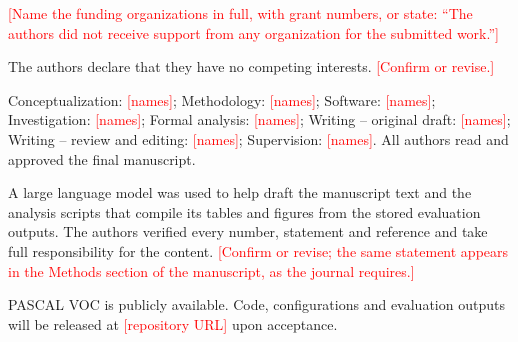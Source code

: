 \documentclass[pdflatex,iicol,sn-basic,Numbered]{sn-jnl}
\newcommand{\ph}[1]{\textcolor{red}{[#1]}}
\begin{document}
\ph{Name the funding organizations in full, with grant numbers, or state: ``The authors did not receive support from any organization for the submitted work.''}

The authors declare that they have no competing interests. \ph{Confirm or revise.}

Conceptualization: \ph{names}; Methodology: \ph{names}; Software: \ph{names}; Investigation: \ph{names}; Formal analysis: \ph{names}; Writing -- original draft: \ph{names}; Writing -- review and editing: \ph{names}; Supervision: \ph{names}. All authors read and approved the final manuscript.

A large language model was used to help draft the manuscript text and the analysis scripts that compile its tables and figures from the stored evaluation outputs. The authors verified every number, statement and reference and take full responsibility for the content. \ph{Confirm or revise; the same statement appears in the Methods section of the manuscript, as the journal requires.}

PASCAL VOC is publicly available. Code, configurations and evaluation outputs will be released at \ph{repository URL} upon acceptance.
\end{document}
